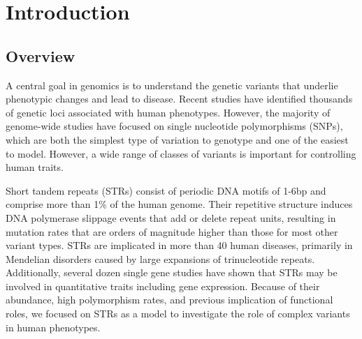 \iffalse  \fi

\chapter{Introduction}

\section{Overview}

A central goal in genomics is to understand the genetic variants that underlie phenotypic changes and lead to disease. Recent studies have identified thousands of genetic loci associated with human phenotypes. However, the majority of genome-wide studies have focused on single nucleotide polymorphisms (SNPs), which are both the simplest type of variation to genotype and one of the easiest to model. However, a wide range of  classes of variants is important for controlling human traits.

Short tandem repeats (STRs) consist of periodic DNA motifs of 1-6bp and comprise more than 1\% of the human genome. Their repetitive structure induces DNA polymerase slippage events that add or delete repeat units, resulting in mutation rates that are orders of magnitude higher than those for most other variant types. STRs are implicated in more than 40 human diseases, primarily in Mendelian disorders caused by large expansions of trinucleotide repeats. Additionally, several dozen single gene studies have shown that STRs may be involved in quantitative traits including gene expression. Because of their abundance, high polymorphism rates, and previous implication of functional roles, we focused on STRs as a model to investigate the role of complex variants in human phenotypes.

